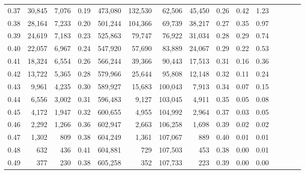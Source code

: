 \begin{tabular}{rrrcrrrrrrrrrrr}
0.37 &  30,845 &  7,076 &                                       0.19 &  473,080 &  132,530 &   62,506 &   45,450 &  0.26 &  0.42 &                         1.23 \\
0.38 &  28,164 &  7,233 &                                       0.20 &  501,244 &  104,366 &   69,739 &   38,217 &  0.27 &  0.35 &                         0.97 \\
0.39 &  24,619 &  7,183 &                                       0.23 &  525,863 &   79,747 &   76,922 &   31,034 &  0.28 &  0.29 &                         0.74 \\
0.40 &  22,057 &  6,967 &                                       0.24 &  547,920 &   57,690 &   83,889 &   24,067 &  0.29 &  0.22 &                         0.53 \\
0.41 &  18,324 &  6,554 &                                       0.26 &  566,244 &   39,366 &   90,443 &   17,513 &  0.31 &  0.16 &                         0.36 \\
0.42 &  13,722 &  5,365 &                                       0.28 &  579,966 &   25,644 &   95,808 &   12,148 &  0.32 &  0.11 &                         0.24 \\
0.43 &   9,961 &  4,235 &                                       0.30 &  589,927 &   15,683 &  100,043 &    7,913 &  0.34 &  0.07 &                         0.15 \\
0.44 &   6,556 &  3,002 &                                       0.31 &  596,483 &    9,127 &  103,045 &    4,911 &  0.35 &  0.05 &                         0.08 \\
0.45 &   4,172 &  1,947 &                                       0.32 &  600,655 &    4,955 &  104,992 &    2,964 &  0.37 &  0.03 &                         0.05 \\
0.46 &   2,292 &  1,266 &                                       0.36 &  602,947 &    2,663 &  106,258 &    1,698 &  0.39 &  0.02 &                         0.02 \\
0.47 &   1,302 &    809 &                                       0.38 &  604,249 &    1,361 &  107,067 &      889 &  0.40 &  0.01 &                         0.01 \\
0.48 &     632 &    436 &                                       0.41 &  604,881 &      729 &  107,503 &      453 &  0.38 &  0.00 &                         0.01 \\
0.49 &     377 &    230 &                                       0.38 &  605,258 &      352 &  107,733 &      223 &  0.39 &  0.00 &                         0.00 \\

\end{tabular}
